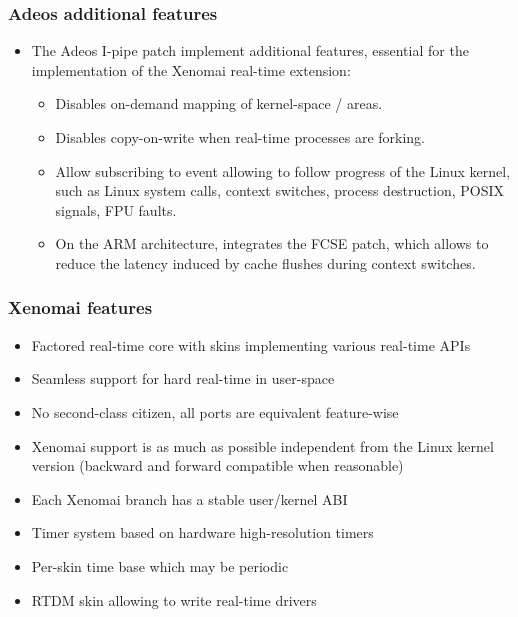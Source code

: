\begin{frame}
  \frametitle{Adeos additional features}
  \begin{itemize}
  \item The Adeos I-pipe patch implement additional features,
    essential for the implementation of the Xenomai real-time
    extension:
    \begin{itemize}
    \item Disables on-demand mapping of kernel-space  /
     areas.
    \item Disables copy-on-write when real-time processes are forking.
    \item Allow subscribing to event allowing to follow progress of
      the Linux kernel, such as Linux system calls, context switches,
      process destruction, POSIX signals, FPU faults.
    \item On the ARM architecture, integrates the FCSE patch, which
      allows to reduce the latency induced by cache flushes during
      context switches.
    \end{itemize}
  \end{itemize}
\end{frame}

\begin{frame}
  \frametitle{Xenomai features}
  \begin{itemize}
  \item Factored real-time core with skins implementing various
    real-time APIs
  \item Seamless support for hard real-time in user-space
  \item No second-class citizen, all ports are equivalent feature-wise
  \item Xenomai support is as much as possible independent from the
    Linux kernel version (backward and forward compatible when
    reasonable)
  \item Each Xenomai branch has a stable user/kernel ABI
  \item Timer system based on hardware high-resolution timers
  \item Per-skin time base which may be periodic
  \item RTDM skin allowing to write real-time drivers
  \end{itemize}
\end{frame}

